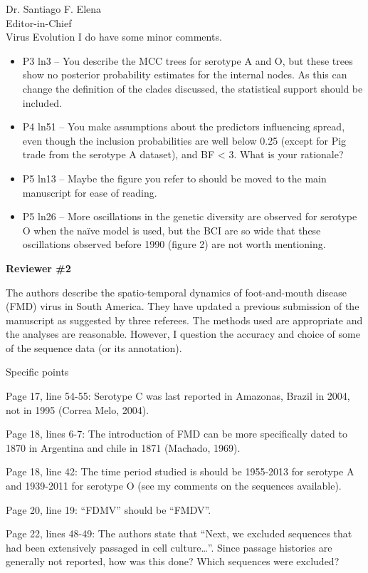 \documentclass[12pt, a4paper]{letter} %
\begin{document}
\begin{letter}{
	Dr. Santiago F. Elena\\
    Editor-in-Chief \\
    Virus Evolution
}
I do have some minor comments.

\begin{itemize}
 \item P3 ln3 – You describe the MCC trees for serotype A and O, but these trees show no posterior probability estimates for the internal nodes.
 As this can change the definition of the clades discussed, the statistical support should be included.
 \item P4 ln51 – You make assumptions about the predictors influencing spread, even though the inclusion probabilities are well below 0.25 (except for Pig trade from the serotype A dataset), and BF < 3.
 What is your rationale?
 \item P5 ln13 – Maybe the figure you refer to should be moved to the main manuscript for ease of reading.
 \item P5 ln26 – More oscillations in the genetic diversity are observed for serotype O when the naïve model is used, but the BCI are so wide that these oscillations observed before 1990 (figure 2) are not worth mentioning.
\end{itemize}

\textbf{Reviewer \#2}

The authors describe the spatio-temporal dynamics of foot-and-mouth disease (FMD) virus in
South America. They have updated a previous submission of the manuscript as suggested by three referees. The methods used are appropriate and the analyses are reasonable. However, I question the accuracy and choice of some of the sequence data (or its annotation).

Specific points

Page 17, line 54-55: Serotype C was last reported in Amazonas, Brazil in 2004, not in 1995 (Correa Melo, 2004).

Page 18, lines 6-7: The introduction of FMD can be more specifically dated to 1870 in Argentina and chile in 1871 (Machado, 1969).

Page 18, line 42: The time period studied is should be 1955-2013 for serotype A and 1939-2011 for serotype O (see my comments on the sequences available).

Page 20, line 19: “FDMV” should be “FMDV”.

Page 22, lines 48-49: The authors state that “Next, we excluded sequences that had been extensively passaged in cell culture…”. Since passage histories are generally not reported, how was this done? Which sequences were excluded?


\end{letter}
\end{document}
